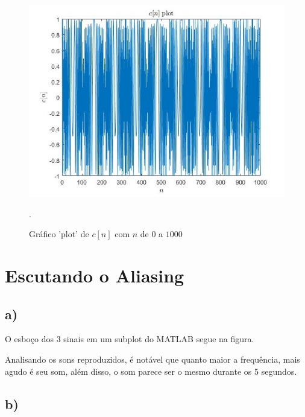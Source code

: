 \documentclass[a4paper, 12pt]{article}
\begin{document}
\begin{figure}[H]
	\centering
	\includegraphics[scale=0.6]{../Imagens/ex2/c.jpg} 
	\caption{Gráfico 'plot' de $c[n]$ com $n$ de $0$ a $1000$}.
	\label{fig:1a}
\end{figure}

\section{Escutando o Aliasing}

\subsection{a)}

O esboço dos 3 sinais em um subplot do MATLAB segue na figura.

Analisando os sons reproduzidos, é notável que quanto maior a frequência, mais agudo é seu som, além disso, o som parece ser o mesmo durante os 5 segundos.

%



\subsection{b)}
\end{document}
